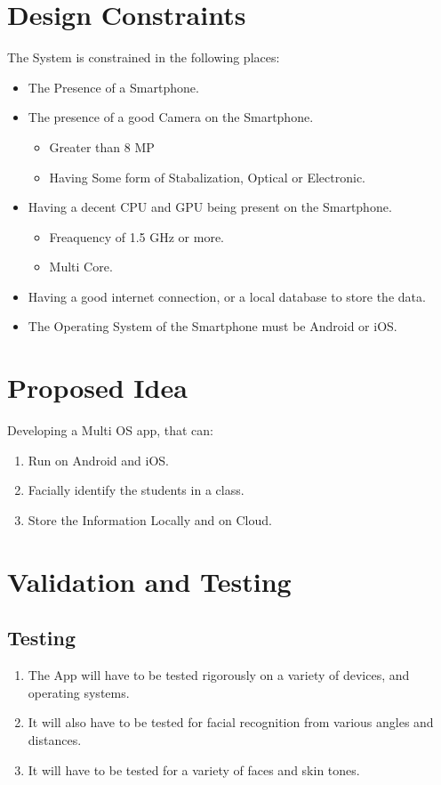 \documentclass[11pt]{article}
\begin{document}
\section{Design Constraints}
The System is constrained in the following places: 
\begin{itemize}
    \item The Presence of a Smartphone.
    \item The presence of a good Camera on the Smartphone.
    \begin{itemize}
        \item Greater than 8 MP
        \item Having Some form of Stabalization, Optical or Electronic.
    \end{itemize}
    \item Having a decent CPU and GPU being present on the Smartphone. 
    \begin{itemize}
        \item Freaquency of 1.5 GHz or more.
        \item Multi Core.
    \end{itemize}
    \item Having a good internet connection, or a local database to store the data.
    \item The Operating System of the Smartphone must be Android or iOS.
\end{itemize}
\section{Proposed Idea}

Developing a Multi OS app, that can: 

\begin{enumerate}
    \item Run on Android and iOS.
    \item Facially identify the students in a class.
    \item Store the Information Locally and on Cloud. 
\end{enumerate}

\section{Validation and Testing}

\subsection{Testing}
\begin{enumerate}
    \item The App will have to be tested rigorously on a variety of devices, and operating systems.
    \item It will also have to be tested for facial recognition from various angles and distances. 
    \item It will have to be tested for a variety of faces and skin tones.
\end{enumerate}
\end{document}
